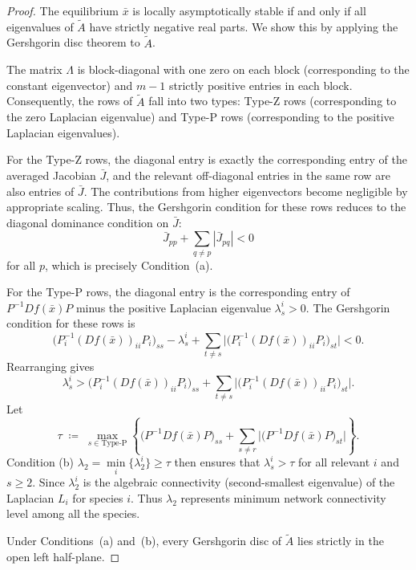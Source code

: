 \documentclass[10pt,a4paper]{amsart}
\begin{document}
\begin{proof}
The equilibrium \(\bar{x}\) is locally asymptotically stable if and only if all eigenvalues of \(\widetilde{A}\) have strictly negative real parts. We show this by applying the Gershgorin disc theorem to \(\widetilde{A}\).

The matrix \(\Lambda\) is block-diagonal with one zero on each block (corresponding to the constant eigenvector) and \(m-1\) strictly positive entries in each block. Consequently, the rows of \(\widetilde{A}\) fall into two types: Type-Z rows (corresponding to the zero Laplacian eigenvalue) and Type-P rows (corresponding to the positive Laplacian eigenvalues).

For the Type-Z rows, the diagonal entry is exactly the corresponding entry of the averaged Jacobian \(\bar{J}\), and the relevant off-diagonal entries in the same row are also entries of \(\bar{J}\). The contributions from higher eigenvectors become negligible by appropriate scaling. Thus, the Gershgorin condition for these rows reduces to the diagonal dominance condition on \(\bar{J}\):
\[
\bar{J}_{pp} + \sum_{q \neq p} |\bar{J}_{pq}| < 0
\]
for all \(p\), which is precisely Condition~(a).

For the Type-P rows, the diagonal entry is the corresponding entry of \(P^{-1}Df(\bar{x})P\) minus the positive Laplacian eigenvalue \(\lambda^i_s > 0\). The Gershgorin condition for these rows is
\[
\bigl(P^{-1}_{i}(Df(\bar{x}))_{ii}P_{i}\bigr)_{ss} - \lambda^i_s + \sum_{t \neq s} \bigl|\bigl(P^{-1}_{i}(Df(\bar{x}))_{ii}P_{i}\bigr)_{st}\bigr| < 0.
\]
Rearranging gives
\[
\lambda^i_s > \bigl(P^{-1}_{i}(Df(\bar{x}))_{ii}P_{i}\bigr)_{ss} + \sum_{t \neq s} \bigl|\bigl(P^{-1}_{i}(Df(\bar{x}))_{ii}P_{i}\bigr)_{st}\bigr|.
\]
Let
\begin{equation}
\tau
\;\coloneqq\;
\max_{s \in \text{Type-P}}
\left\{
\bigl(P^{-1}Df(\bar{x})P\bigr)_{ss}
+ \sum_{s \neq r}
\bigl|\bigl(P^{-1}Df(\bar{x})P\bigr)_{st}\bigr|
\right\}.
\label{eq:tau}
\end{equation}
Condition (b) \(\lambda_2 =\underset{i}{\min}\{\lambda^i_2\} \ge \tau\) then ensures that \(\lambda^i_s > \tau\) for all relevant \(i\) and \(s \geq 2\).  Since  \(\lambda_2^i\) is the algebraic connectivity (second-smallest eigenvalue) of the Laplacian \(L_i\) for species \(i\). Thus \(\lambda_2\) represents minimum network connectivity level among all the species. 

Under Conditions~(a) and~(b), every Gershgorin disc of \(\widetilde{A}\) lies strictly in the open left half-plane. 
\end{proof}
\end{document}

